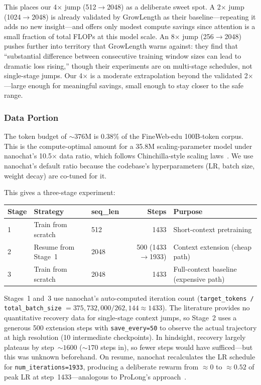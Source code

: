 This places our 4$\times$ jump (512$\to$2048) as a deliberate sweet spot. A 2$\times$ jump (1024$\to$2048) is already validated by GrowLength as their baseline---repeating it adds no new insight---and offers only modest compute savings since attention is a small fraction of total FLOPs at this model scale. An 8$\times$ jump (256$\to$2048) pushes further into territory that GrowLength warns against: they find that ``substantial difference between consecutive training window sizes can lead to dramatic loss rising,'' though their experiments are on multi-stage schedules, not single-stage jumps. Our 4$\times$ is a moderate extrapolation beyond the validated 2$\times$---large enough for meaningful savings, small enough to stay closer to the safe range.

\subsubsection{Data Portion}

The token budget of ${\sim}376$M is 0.38\% of the FineWeb-edu 100B-token corpus. This is the compute-optimal amount for a 35.8M scaling-parameter model under nanochat's 10.5$\times$ data ratio, which follows Chinchilla-style scaling laws~\cite{chinchilla}. We use nanochat's default ratio because the codebase's hyperparameters (LR, batch size, weight decay) are co-tuned for it.

This gives a three-stage experiment:

\begin{table}[H]
\centering\small
\begin{tabular}{@{}lllrl@{}}
\toprule
Stage & Strategy & seq\_len & Steps & Purpose \\
\midrule
1 & Train from scratch & 512 & 1433 & Short-context pretraining \\
2 & Resume from Stage~1 & 2048 & 500 (1433$\to$1933) & Context extension (cheap path) \\
3 & Train from scratch & 2048 & 1433 & Full-context baseline (expensive path) \\
\bottomrule
\end{tabular}
\end{table}

Stages~1 and~3 use nanochat's auto-computed iteration count (\texttt{target\_tokens / total\_batch\_size} $= 375{,}732{,}000 / 262{,}144 \approx 1433$). The literature provides no quantitative recovery data for single-stage context jumps, so Stage~2 uses a generous 500 extension steps with \texttt{save\_every=50} to observe the actual trajectory at high resolution (10 intermediate checkpoints). In hindsight, recovery largely plateaus by step~${\sim}1600$ (${\sim}170$ steps in), so fewer steps would have sufficed---but this was unknown beforehand. On resume, nanochat recalculates the LR schedule for \texttt{num\_iterations=1933}, producing a deliberate rewarm from ${\approx}0$ to ${\approx}0.52$ of peak LR at step~1433---analogous to ProLong's approach~\cite{prolong}.

